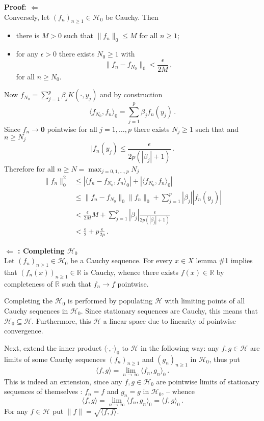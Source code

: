 \documentclass[a4paper]{article}
\newcommand{\Real}{\mathbb{R}}
\newcommand{\nil}{\mathbf{0}}
\newcommand{\Hcal}{\mathcal{H}}
\begin{document}
\noindent\textbf{Proof: $\Leftarrow$} \hfill\\
Conversely, let $(f_n)_{n\geq1}\in \Hcal_0$ be Cauchy. Then \begin{itemize}
	\item there is $M>0$ such that $\|f_n\|_0\leq M$ for all $n\geq 1$;
	\item for any $\epsilon>0$ there exists $N_0\geq1$ with
		\[ \|f_n - f_{N_0} \|_0 < \frac{\epsilon}{2M}\,, \]
		for all $n\geq N_0$.
\end{itemize}
Now $f_{N_0} = \sum_{j=1}^p \beta_j K(\cdot,y_j)$ and by construction
\[ \langle f_{N_0}, f_n \rangle_0 = \sum_{j=1}^p \beta_j f_n(y_j)\,. \]
Since $f_n \to \nil$ pointwise for all $j=1,\ldots,p$ there exists $N_j\geq 1$
such that and $n\geq N_j$
\[ |f_n(y_j) \leq \frac{\epsilon}{2 p ( |\beta_j| + 1 ) }\,. \]
Therefore for all $n \geq N = \max_{j=0,1,\ldots,p}N_j$
\begin{align*}
	\|f_n\|_0^2
	& \leq |\langle f_n-f_{N_0},f_n \rangle_0| + |\langle f_{N_0}, f_n \rangle_0| \\
	& \leq \|f_n-f_{N_0}\|_0 \|f_n\|_0 + \sum_{j=1}^p |\beta_j| |f_n(y_j)| \\
	& < \frac{\epsilon}{2M} M + \sum_{j=1}^p |\beta_j| \frac{\epsilon}{2 p ( |\beta_j| + 1 ) }\\
	& < \frac{\epsilon}{2} + p\frac{\epsilon}{2p}\,.
\end{align*}

\noindent \textbf{ $\Leftarrow$ : Completing $\Hcal_0$}\hfill\\
Let $(f_n)_{n\geq1}\in \Hcal_0$ be a Cauchy sequence. For every $x\in X$ lemma \#1
implies that $(f_n(x))_{n\geq1}\in\Real$ is Cauchy, whence there exists $f(x)\in \Real$
by completeness of $\Real$ such that $f_n\to f$ pointwise.

Completing the $\Hcal_0$ is performed by populating $\Hcal$ with limiting points
of all Cauchy sequences in $\Hcal_0$. Since stationary sequences are Cauchy, this
means that $\Hcal_0\subseteq \Hcal$. Furthermore, this $\Hcal$ a linear space due to
linearity of pointwise convergence.

Next, extend the inner product $\langle\cdot,\cdot\rangle_0$ to $\Hcal$ in the following
way: any $f,g\in \Hcal$ are limits of some Cauchy sequences $(f_n)_{n\geq1}$ and
$(g_n)_{n\geq1}$ in $\Hcal_0$, thus put
\[
\langle f, g \rangle = \lim_{n\to \infty} \langle f_n, g_n \rangle_0\,.
\]
This is indeed an extension, since any $f, g \in \Hcal_0$ are pointwise limits of
stationary sequences of themselves : $f_n=f$ and $g_n=g$ in $\Hcal_0$, -- whence
\[
\langle f, g\rangle
= \lim_{n\to \infty} \langle f_n, g_n \rangle_0
= \langle f, g \rangle_0\,.
\]
For any $f\in \Hcal$ put $\|f\| = \sqrt{ \langle f,f\rangle}$.
\end{document}
